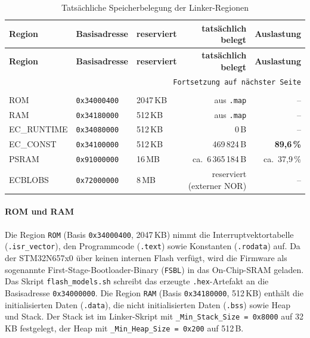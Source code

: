 \begin{longtable}{l l l r r}
    \hline
    \textbf{Region} & \textbf{Basisadresse} & \textbf{reserviert} & \textbf{tatsächlich belegt} & \textbf{Auslastung} \\
    \hline
    \endfirsthead
    \hline
    \textbf{Region} & \textbf{Basisadresse} & \textbf{reserviert} & \textbf{tatsächlich belegt} & \textbf{Auslastung} \\
    \hline
    \endhead
    \hline
    \multicolumn{5}{r}{\texttt{Fortsetzung auf nächster Seite}} \\
    \endfoot
    \caption{Tatsächliche Speicherbelegung der Linker-Regionen}
    \label{tab:linker-regionen} \\
    \endlastfoot
    ROM         & \texttt{0x34000400} & 2047\,KB & aus \texttt{.map} & -- \\
    \hline
    RAM         & \texttt{0x34180000} & 512\,KB  & aus \texttt{.map} & -- \\
    \hline
    EC\_RUNTIME & \texttt{0x34080000} & 512\,KB  & 0\,B & -- \\
    \hline
    EC\_CONST   & \texttt{0x34100000} & 512\,KB  & 469\,824\,B & \textbf{89{,}6\,\%} \\
    \hline
    PSRAM       & \texttt{0x91000000} & 16\,MB   & ca.\ 6\,365\,184\,B & ca.\ 37{,}9\,\% \\
    \hline
    ECBLOBS     & \texttt{0x72000000} & 8\,MB    & reserviert (externer NOR) & -- \\
    \hline
\end{longtable}

\paragraph{ROM und RAM}

Die Region \texttt{ROM} (Basis \texttt{0x34000400}, 2047\,KB) nimmt die
Interruptvektortabelle (\texttt{.isr\_vector}), den Programmcode
(\texttt{.text}) sowie Konstanten (\texttt{.rodata}) auf. Da der
STM32N657x0 über keinen internen Flash verfügt, wird die Firmware als
sogenannte First-Stage-Bootloader-Binary (\texttt{FSBL}) in das
On-Chip-SRAM geladen. Das Skript \texttt{flash\_models.sh} schreibt das
erzeugte \texttt{.hex}-Artefakt an die Basisadresse \texttt{0x34000000}.
Die Region \texttt{RAM} (Basis \texttt{0x34180000}, 512\,KB) enthält die
initialisierten Daten (\texttt{.data}), die nicht initialisierten Daten
(\texttt{.bss}) sowie Heap und Stack. Der Stack ist im Linker-Skript mit
\texttt{\_Min\_Stack\_Size = 0x8000} auf 32\,KB festgelegt, der Heap mit
\texttt{\_Min\_Heap\_Size = 0x200} auf 512\,B.

